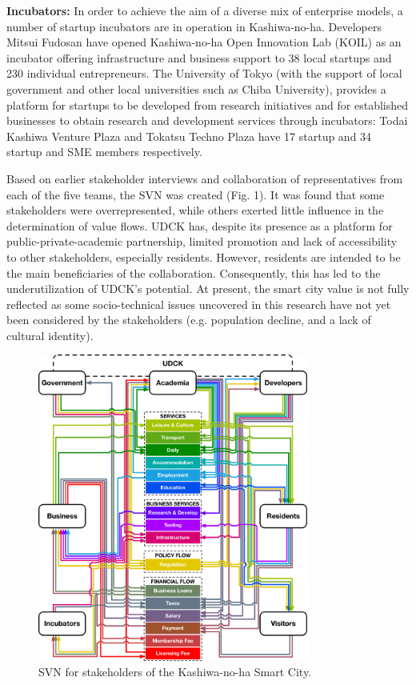 \documentclass[conference]{IEEEtran}
\begin{document}
\textbf{Incubators:} In order to achieve the aim of a diverse mix of enterprise models, a number of startup incubators are in operation in Kashiwa-no-ha. Developers Mitsui Fudosan have opened Kashiwa-no-ha Open Innovation Lab (KOIL) as an incubator offering infrastructure and business support to 38 local startups and 230 individual entrepreneurs. The University of Tokyo (with the support of local government and other local universities such as Chiba University), provides a platform for startups to be developed from research initiatives and for established businesses to obtain research and development services through incubators: Todai Kashiwa Venture Plaza and Tokatsu Techno Plaza have 17 startup and 34 startup and SME members respectively.


Based on earlier stakeholder interviews and collaboration of representatives from each of the five teams, the SVN was created (Fig. 1). It was found that some stakeholders were overrepresented, while others exerted little influence in the determination of value flows. UDCK has, despite its presence as a platform for public-private-academic partnership, limited promotion and lack of accessibility to other stakeholders, especially residents. However, residents are intended to be the main beneficiaries of the collaboration. Consequently, this has led to the underutilization of UDCK’s potential. At present, the smart city value is not fully reflected as some socio-technical issues uncovered in this research have not yet been considered by the stakeholders (e.g. population decline, and a lack of cultural identity).

\begin{figure}[ht!] %
\centering
\includegraphics[width=3.5in]{SVN_1_v_7.pdf}
\caption{SVN for stakeholders of the Kashiwa-no-ha Smart City.}
\label{FULL}
\end{figure}
\end{document}
